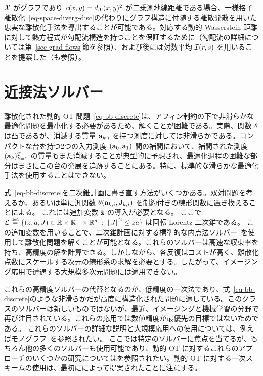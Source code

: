 \begin{rem}[グラフ上の動的定式化]
$\mathcal{X}$ がグラフであり $c(x,y)=d_{\mathcal{X}}(x,y)^2$ が二乗測地線距離である場合、一様格子離散化~\eqref{eq-space-diverg-disc}の代わりにグラフ構造に付随する離散発散を用いた忠実な離散化手法を導出することが可能である。対応する動的 Wasserstein 距離に対して熱方程式が勾配流構造を持つことを保証するために（勾配流の詳細については第~\ref{sec-grad-flows}節を参照）、\citet{Maas2011}および後に\citet{MielkeCVPDE}は対数平均 $\mathcal{I}(r,s)$ を用いることを提案した（\citep{solomon2016continuous,ChowHuangLiZhou2012,chow2017entropy,chow2017discrete}も参照）。
\end{rem}

\section{近接法ソルバー}
\label{sec-prox-solvers}

離散化された動的 OT 問題~\eqref{eq-bb-discrete}は、アフィン制約の下で非滑らかな最適化問題を最小化する必要があるため、解くことが困難である。実際、関数 $\theta$ は凸であるが、消滅する質量 $\mathrm{\textbf{a}}_{k,i}$ を持つ測度に対しては非滑らかである。コンパクトな台を持つ2つの入力測度 $(\mathrm{\textbf{a}}_0,\mathrm{\textbf{a}}_1)$ 間の補間において、補間された測度 $(\mathrm{\textbf{a}}_{k})_{k=1}^T$ の質量もまた消滅することが典型的に予想され、最適化過程の困難な部分はまさにこの台の発展を追跡することにある。特に、標準的な滑らかな最適化手法を使用することはできない。

式~\eqref{eq-bb-discrete}を二次錐計画に書き直す方法がいくつかある。双対問題を考えるか、あるいは単に汎関数 $\theta( \mathrm{\textbf{a}}_{k,i}, \mathrm{\textbf{J}}_{k,i} )$ を制約付きの線形関数に置き換えることによる。
これには追加変数 $\tilde {\mathrm{\textbf{z}}}$ の導入が必要となる。
ここで $\mathcal{L} \stackrel{\mbox{\upshape\tiny def.}}{=} \{  (z,a,J) \in \mathbb{R} \times \mathbb{R}^+ \times \mathbb{R}^d  \;:\;  \left\| J \right\|^2 \leq z a  \}$ は回転 Lorentz 二次錐である。
この追加変数を用いることで、二次錐計画に対する標準的な内点法ソルバー~\citep{nesterov1994interior}を使用して離散化問題を解くことが可能となる。これらのソルバーは高速な収束率を持ち、高精度の解を計算できる。しかしながら、各反復はコストが高く、離散化点数にスケールする次元の線形系の求解を必要とする。したがって、イメージング応用で遭遇する大規模多次元問題には適用できない。

これらの高精度ソルバーの代替となるのが、低精度の一次法であり、式~\eqref{eq-bb-discrete}のような非滑らかだが高度に構造化された問題に適している。このクラスのソルバーは新しいものではないが、最近、イメージングと機械学習の分野で再び注目されている。これらの応用では数値精度が最優先の目標ではないためである。
これらのソルバーの詳細な説明と大規模応用への使用については、例えばモノグラフ~\citep{BauschkeCombettes11}を参照されたい。
ここでは特定のソルバーに焦点を当てるが、もちろん他の多くのソルバーも使用可能であり、動的 OT に対するこれらのアプローチのいくつかの研究については\citep{FPapPeyOud13}を参照されたい。動的 OT に対する一次スキームの使用は、最初に\citet{benamou2000computational}によって提案されたことに注意する。


